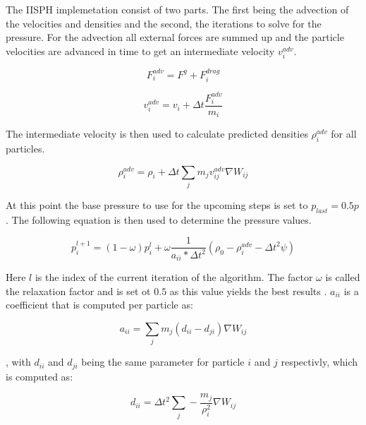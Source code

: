 \documentclass[intern]{cgMA}
\begin{document}
    The IISPH implemetation consist of two parts. The first being the advection of the velocities and densities and the second, the iterations to solve for the pressure. For the advection all external forces are summed up and the particle velocities are advanced in time to get an intermediate velocity $v_i^{adv}$. \cite{6570475}

    \begin{equation}
        F_i^{adv} = F^g + F_i^{drag}
    \end{equation}

    \begin{equation}
        v_i^{adv} = v_i + \Delta t \frac{F_i^{adv}}{m_i}
    \end{equation}

    The intermediate velocity is then used to calculate predicted densities $\rho_i^{adv}$ for all particles. \cite{6570475}

    \begin{equation}
        \rho_i^{adv} = \rho_i + \Delta t \sum_j m_j v_{ij}^{adv} \nabla W_{ij}
    \end{equation}
    
    At this point the base pressure to use for the upcoming steps is set to $p_{last} = 0.5p$ \cite{6570475}. The following equation is then used to determine the pressure values.

    \begin{equation}
        p_i^{l+1} = (1 - \omega) p_i^l + \omega \frac{1}{a_{ii} * \Delta t^2} (\rho_0 - \rho_i^{adv} - \Delta t^2 \psi)
    \end{equation}

    Here $l$ is the index of the current iteration of the algorithm. The factor $\omega$ is called the relaxation factor and is set ot $0.5$ as this value yields the best results \cite{6570475}. $a_{ii}$ is a coefficient that is computed per particle as: 

    \begin{equation}
        a_{ii} = \sum_j m_j (d_{ii} - d_{ji}) \nabla W_{ij}
    \end{equation}

    , with $d_{ii}$ and $d_{ji}$ being the same parameter for particle $i$ and $j$ respectivly, which is computed as:

    \begin{equation}
        d_{ii} = \Delta t^2 \sum_j -\frac{m_j}{\rho_i^2} \nabla W_{ij}
    \end{equation}
\end{document}
